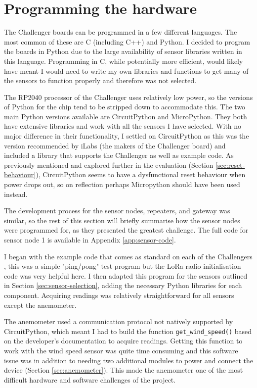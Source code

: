 \section{Programming the hardware}

The Challenger boards can be programmed in a few different languages. The most
common of these are C (including C++) and Python. I decided to program the
boards in Python due to the large availability of sensor libraries written in
this language. Programming in C, while potentially more efficient, would likely
have meant I would need to write my own libraries and functions to get many of
the sensors to function properly and therefore was not selected.

The RP2040 processor of the Challenger uses relatively low power, so the
versions of Python for the chip tend to be stripped down to accommodate this.
The two main Python versions available are CircuitPython and MicroPython. They
both have extensive libraries and work with all the sensors I have selected.
With no major difference in their functionality, I settled on CircuitPython as
this was the version recommended by iLabs (the makers of the Challenger board)
and included a library that supports the Challenger as well as example code. As
previously mentioned and explored further in the evaluation (Section
\ref{sec:reset-behaviour}), CircuitPython seems to have a dysfunctional reset
behaviour when power drops out, so on reflection perhaps Micropython should have
been used instead.

The development process for the sensor nodes, repeaters, and gateway was
similar, so the rest of this section will briefly summarise how the sensor nodes
were programmed for, as they presented the greatest challenge. The full code for
sensor node 1 is available in Appendix \ref{app:sensor-code}.

I began with the example code that comes as standard on each of the Challengers
\cite{needell_challenger-rp2040_2025}, this was a simple "ping/pong" test
program but the LoRa radio initialisation code was very helpful here. I then
adapted this program for the sensors outlined in Section
\ref{sec:sensor-selection}, adding the necessary Python libraries for each
component. Acquiring readings was relatively straightforward for all sensors
except the anemometer.

The anemometer used a communication protocol not natively supported by
CircuitPython, which meant I had to build the function
\texttt{get\_wind\_speed()} based on the developer's documentation
\cite{dfrobotGuide} to acquire readings. Getting this function to work with the
wind speed sensor was quite time consuming and this software issue was in
addition to needing two additional modules to power and connect the device
(Section \ref{sec:anemometer}). This made the anemometer one of the most
difficult hardware and software challenges of the project.

